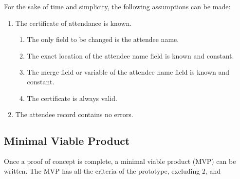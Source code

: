 \documentclass[11pt]{article}
\begin{document}
\noindent
For the sake of time and simplicity, the following assumptions can be made:

\begin{enumerate}
    \item The certificate of attendance is known.
    \begin{enumerate}
        \item The only field to be changed is the attendee name.
        \item The exact location of the attendee name field is known and constant.
        \item The merge field or variable of the attendee name field is known and constant.
        \item The certificate is always valid.
    \end{enumerate}
    \item The attendee record contains no errors.
\end{enumerate}

\subsection{Minimal Viable Product}

Once a proof of concept is complete, a minimal viable product (MVP) can be written. The MVP has all the criteria of the prototype, excluding 2, and
\end{document}
